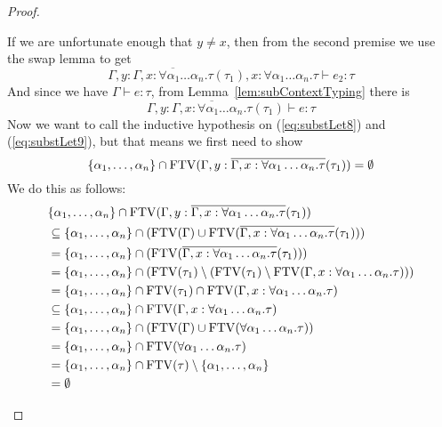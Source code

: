 \begin{proof}
\begin{description}
  If we are unfortunate enough that $y \ne x$, then from the second
  premise we use the swap lemma to get
  \begin{equation} \label{eq:substLet8}
    \Gamma , y : \overline{\Gamma, x : \forall\alpha_1\ldots\alpha_n . \tau}(\tau_1), x : \forall \alpha_1\ldots\alpha_n . \tau  \vdash
    e_2 : \tau
  \end{equation}
  And since we have $\Gamma \vdash e : \tau$, from Lemma~\ref{lem:subContextTyping}
  there is
  \begin{equation} \label{eq:substLet9}
  \Gamma , y : \overline{\Gamma , x :\forall\alpha_1\ldots\alpha_n . \tau}(\tau_1) \vdash e : \tau    
  \end{equation}
  Now we want to call the inductive hypothesis on (\ref{eq:substLet8})
  and (\ref{eq:substLet9}), but that means we first need to show
  \[\{ \alpha_1,\ldots,\alpha_n\} \cap \operatorname{FTV}(\Gamma , y : \overline{\Gamma, x : \forall\alpha_1\ldots\alpha_n . \tau}(\tau_1))
    = \emptyset\]
  We do this as follows:
  \begin{align*}
    & \{ \alpha_1,\ldots,\alpha_n\} \cap \operatorname{FTV}(\Gamma , y : \overline{\Gamma, x : \forall\alpha_1\ldots\alpha_n . \tau}(\tau_1)) \\
    &\subseteq \{ \alpha_1,\ldots,\alpha_n\} \cap (\operatorname{FTV}(\Gamma) \cup \operatorname{FTV}(\overline{\Gamma, x : \forall\alpha_1\ldots\alpha_n
      . \tau}(\tau_1))) \\
    &= \{ \alpha_1,\ldots,\alpha_n\} \cap (\operatorname{FTV}(\overline{\Gamma, x : \forall\alpha_1\ldots\alpha_n . \tau}(\tau_1)))
    \\
    &= \{ \alpha_1,\ldots,\alpha_n\} \cap (\operatorname{FTV}(\tau_1) \setminus (\operatorname{FTV}(\tau_1) \setminus \operatorname{FTV}(\Gamma,x:\forall
      \alpha_1\ldots\alpha_n.\tau))) \\
    &= \{ \alpha_1,\ldots,\alpha_n\} \cap \operatorname{FTV}(\tau_1) \cap \operatorname{FTV}(\Gamma, x : \forall \alpha_1\ldots\alpha_n . \tau) \\
    &\subseteq \{ \alpha_1,\ldots,\alpha_n\} \cap \operatorname{FTV}(\Gamma, x : \forall \alpha_1\ldots\alpha_n . \tau) \\
    &= \{ \alpha_1,\ldots,\alpha_n\} \cap (\operatorname{FTV}(\Gamma) \cup \operatorname{FTV}(\forall \alpha_1\ldots\alpha_n . \tau)) \\
    &= \{ \alpha_1,\ldots,\alpha_n\} \cap \operatorname{FTV}(\forall \alpha_1\ldots\alpha_n . \tau) \\
    &= \{ \alpha_1,\ldots,\alpha_n\} \cap \operatorname{FTV}(\tau) \setminus \{\alpha_1,\ldots,\alpha_n\} \\
    &= \emptyset
  \end{align*}

\end{description}
\end{proof}
